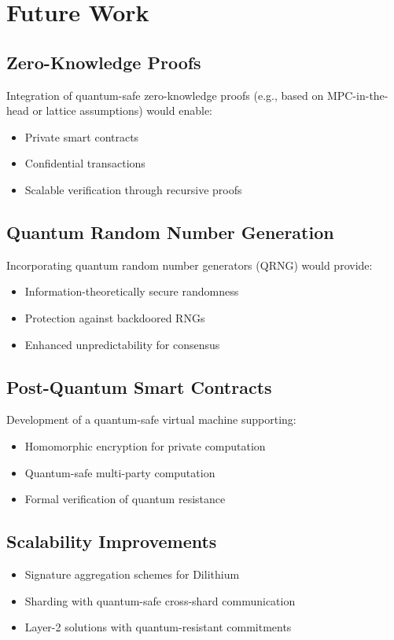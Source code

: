 \documentclass[12pt,a4paper]{article}
\begin{document}
\section{Future Work}

\subsection{Zero-Knowledge Proofs}
Integration of quantum-safe zero-knowledge proofs (e.g., based on MPC-in-the-head or lattice assumptions) would enable:
\begin{itemize}
\item Private smart contracts
\item Confidential transactions
\item Scalable verification through recursive proofs
\end{itemize}

\subsection{Quantum Random Number Generation}
Incorporating quantum random number generators (QRNG) would provide:
\begin{itemize}
\item Information-theoretically secure randomness
\item Protection against backdoored RNGs
\item Enhanced unpredictability for consensus
\end{itemize}

\subsection{Post-Quantum Smart Contracts}
Development of a quantum-safe virtual machine supporting:
\begin{itemize}
\item Homomorphic encryption for private computation
\item Quantum-safe multi-party computation
\item Formal verification of quantum resistance
\end{itemize}

\subsection{Scalability Improvements}
\begin{itemize}
\item Signature aggregation schemes for Dilithium
\item Sharding with quantum-safe cross-shard communication
\item Layer-2 solutions with quantum-resistant commitments
\end{itemize}
\end{document}
